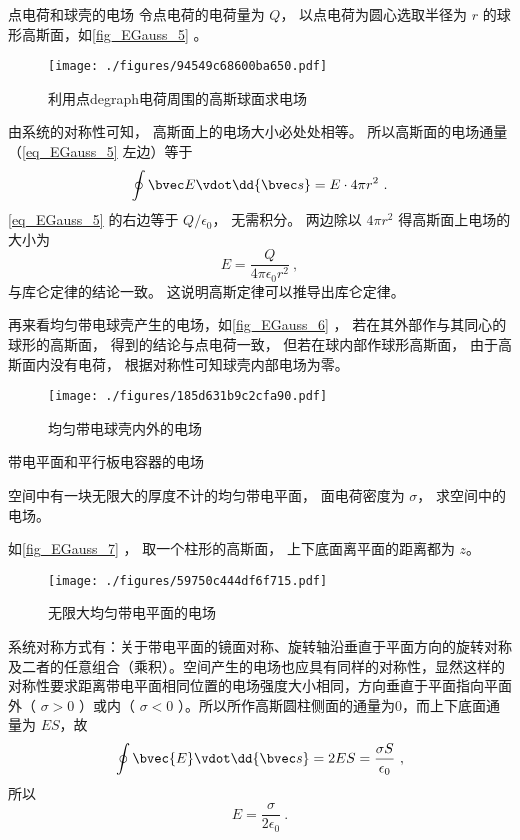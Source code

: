 \begin{example}{点电荷和球壳的电场}\label{ex_EGauss_10}
令点电荷的电荷量为 $Q$， 以点电荷为圆心选取半径为 $r$ 的球形高斯面，如\autoref{fig_EGauss_5} 。 
\begin{figure}[ht]
\centering
\texttt{[image: ./figures/94549c68600ba650.pdf]}
\caption{利用点degraph电荷周围的高斯球面求电场} \label{fig_EGauss_5}
\end{figure}
由系统的对称性可知， 高斯面上的电场大小必处处相等。 所以高斯面的电场通量（\autoref{eq_EGauss_5} 左边）等于
\begin{equation}
\oint \bvec E \vdot \dd{\bvec s} = E \cdot 4\pi r^2~.
\end{equation}
\autoref{eq_EGauss_5} 的右边等于 $Q/\epsilon_0$， 无需积分。 两边除以 $4\pi r^2$ 得高斯面上电场的大小为
\begin{equation}
E = \frac{Q}{4\pi\epsilon_0 r^2}~,
\end{equation}
与库仑定律的结论一致。 这说明高斯定律可以推导出库仑定律。

再来看均匀带电球壳产生的电场，如\autoref{fig_EGauss_6} ， 若在其外部作与其同心的球形的高斯面， 得到的结论与点电荷一致， 但若在球内部作球形高斯面， 由于高斯面内没有电荷， 根据对称性可知球壳内部电场为零。
\begin{figure}[ht]
\centering
\texttt{[image: ./figures/185d631b9c2cfa90.pdf]}
\caption{均匀带电球壳内外的电场} \label{fig_EGauss_6}
\end{figure}
\end{example}


\begin{example}{带电平面和平行板电容器的电场}

空间中有一块无限大的厚度不计的均匀带电平面， 面电荷密度为 $\sigma$， 求空间中的电场。

如\autoref{fig_EGauss_7} ， 取一个柱形的高斯面， 上下底面离平面的距离都为 $z$。
\begin{figure}[ht]
\centering
\texttt{[image: ./figures/59750c444df6f715.pdf]}
\caption{无限大均匀带电平面的电场} \label{fig_EGauss_7}
\end{figure}
系统对称方式有：关于带电平面的镜面对称、旋转轴沿垂直于平面方向的旋转对称及二者的任意组合（乘积）。空间产生的电场也应具有同样的对称性，显然这样的对称性要求距离带电平面相同位置的电场强度大小相同，方向垂直于平面指向平面外（ $\sigma>0$ ）或内（ $\sigma<0$ ）。所以所作高斯圆柱侧面的通量为0，而上下底面通量为 $ES$，故
\begin{equation}
\oint \bvec{E}\vdot \dd{\bvec s}=2ES=\frac{\sigma S}{\epsilon_0}~,
\end{equation}
所以
\begin{equation}
E=\frac{\sigma}{2\epsilon_0}~.
\end{equation}

\end{example}

